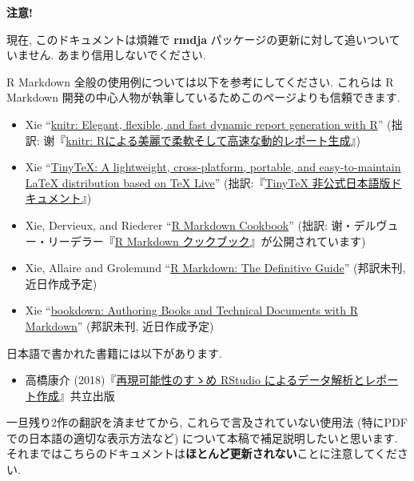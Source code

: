 \documentclass[
  xelatex,ja=standard,jafont=noto]{bxjsbook}
\providecommand{\tightlist}{%
  \setlength{\itemsep}{0pt}\setlength{\parskip}{0pt}}
\newenvironment{infobox}[1]{\begin{itemize}\renewcommand{\labelitemi}{\raisebox{-.7\height}[0pt][0pt]{%
  {\setkeys{Gin}{width=3em,keepaspectratio}\texttt{[image: \_latex/\_img/\#1]}}}}
  \setlength{\fboxsep}{1em}
  \begin{greyblock}
  \item
  }{\end{greyblock}\end{itemize}
}
\theoremstyle{definition}
\theoremstyle{definition}
\theoremstyle{definition}
\theoremstyle{definition}
\theoremstyle{remark}
\begin{document}
\begin{infobox}{caution}
\textbf{注意!}

現在, このドキュメントは煩雑で \textbf{rmdja}
パッケージの更新に対して追いついていません. あまり信用しないでください.

R Markdown 全般の使用例については以下を参考にしてください. これらは R
Markdown 開発の中心人物が執筆しているためこのページよりも信頼できます.

\begin{itemize}
\tightlist
\item
  Xie ``\href{https://yihui.org/knitr/}{knitr: Elegant, flexible, and
  fast dynamic report generation with R}'' (拙訳:
  谢『\href{https://gedevan-aleksizde.github.io/knitr-doc-ja/index.html}{knitr:
  Rによる美麗で柔軟そして高速な動的レポート生成}』)
\item
  Xie ``\href{https://yihui.org/tinytex/}{TinyTeX: A lightweight,
  cross-platform, portable, and easy-to-maintain LaTeX distribution
  based on TeX Live}''
  (拙訳:『\href{https://gedevan-aleksizde.github.io/tinytex-doc-ja/}{TinyTeX
  非公式日本語版ドキュメント}』)
\item
  Xie, Dervieux, and Riederer
  ``\href{https://bookdown.org/yihui/rmarkdown-cookbook/}{R Markdown
  Cookbook}'' (拙訳:
  谢・デルヴュー・リーデラー『\href{https://gedevan-aleksizde.github.io/rmarkdown-cookbook/}{R
  Markdown クックブック}』が公開されています)
\item
  Xie, Allaire and Grolemund
  ``\href{https://bookdown.org/yihui/rmarkdown/}{R Markdown: The
  Definitive Guide}'' (邦訳未刊, 近日作成予定)
\item
  Xie ``\href{https://bookdown.org/yihui/bookdown/}{bookdown: Authoring
  Books and Technical Documents with R Markdown}'' (邦訳未刊,
  近日作成予定)
\end{itemize}

日本語で書かれた書籍には以下があります.

\begin{itemize}
\tightlist
\item
  高橋康介
  (2018)『\href{https://www.kyoritsu-pub.co.jp/bookdetail/9784320112438}{再現可能性のすゝめ
  RStudio によるデータ解析とレポート作成}』共立出版
\end{itemize}

一旦残り2作の翻訳を済ませてから, これらで言及されていない使用法
(特にPDFでの日本語の適切な表示方法など)
について本稿で補足説明したいと思います.
それまではこちらのドキュメントは\textbf{ほとんど更新されない}ことに注意してください.

\end{infobox}
\end{document}
